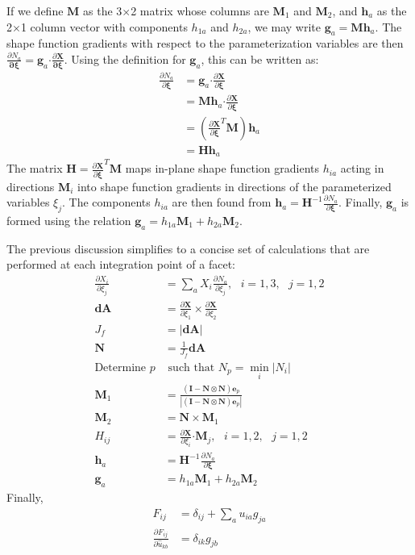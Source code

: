 If we define ${\bm {M}}$ as the 3$\times$2 matrix whose columns are ${\bm {M}}_1$ and ${\bm M}_2$, and $\bm{h}_a$ as the 2$\times$1 column vector with components $h_{1a}$ and $h_{2a}$, we may write ${\bm g}_a = {\bm M}{\bm h}_a$. The shape function gradients with respect to the parameterization variables are then \mbox{$\frac{\partial N_a}{\bm{\partial {\xi}}} = {\bm g}_a \bm{\cdot} \frac{\partial {\bm X}}{\bm{\partial {\xi}}}$}. Using the definition for ${\bm g}_a$, this can be written as:
\begin{align}
\frac{\partial N_a}{\partial {\bm \xi}} &= {\bm g}_a \bm{\cdot} \frac{\partial {\bm X}}{\partial {\bm \xi}} \\
&= {\bm M}{\bm h}_a \bm{\cdot} \frac{\partial {\bm X}}{\partial {\bm \xi}} \\
&= (\frac{\partial {\bm X}}{\partial {\bm \xi}}^T{\bm M}){\bm h}_a \\
&= {\bm H}{\bm h}_a
\end{align}
The matrix ${\bm H} = \frac{\partial {\bm X}}{\partial {\bm \xi}}^T{\bm M}$ maps in-plane shape function gradients $h_{ia}$ acting in directions ${\bm M}_i$ into shape function gradients in directions of the parameterized variables ${\xi_j}$. The components $h_{ia}$ are then found from ${\bm h}_a = {\bm H}^{-1}\frac{\partial N_a}{\partial {\bm \xi}}$. Finally, ${\bm g}_a$ is formed using the relation ${\bm g}_a = {h_{1a}}{\bm M}_1 + {h_{2a}}{\bm M}_2$.

The previous discussion simplifies to a concise set of calculations that are performed at each integration point of a facet:
\begin{align}
\frac{\partial X_{i}}{\partial \xi_j} &= \sum_a X_{i}\frac{\partial N_a}{\partial \xi_j}, \text{\ \ \ \ }i=1,3, \text{\ \ }j = 1,2 \\
{\bm{dA}} &= \frac{\partial{\bm{X}}}{\partial \xi_1} \times \frac{\partial {\bm {X}}}{\partial \xi_2} \\
J_f &= | {\bm {dA}}| \\
{\bm N} &= \frac{1}{J_f}{\bm {dA}} \\
\text{Determine } p &\text{ such that } N_p = \min_i{|N_i|} \\
{\bm M}_1 &=\frac{ ({\bm I} - {\bm N}\otimes{\bm N}){\bm e}_p}{|({\bm I} - {\bm N}\otimes{\bm N}){\bm e}_p|} \\
{\bm M}_2 &= {\bm N} \times {\bm M}_1 \\
H_{ij} &= \frac{\partial {\bm X}}{\partial \xi_i} \bm{\cdot} {\bm M}_j, \text{\ \ \ \ }i=1,\text{2}, \text{\ \ }j = 1,\text{2} \\
{\bm h}_a &= {\bm H}^{-1} \frac{\partial N_a}{\partial {\bm \xi}} \\
{\bm g}_a &= h_{1a}{\bm M}_1 + h_{2a}{\bm M}_2
\end{align}
Finally,
\begin{align}
F_{ij} &= \delta_{ij} + \sum_a{u_{ia}g_{ja}} \\
\frac{\partial F_{ij}}{\partial \hat{u}_{kb}} &= \delta_{ik}g_{jb}
\end{align}

